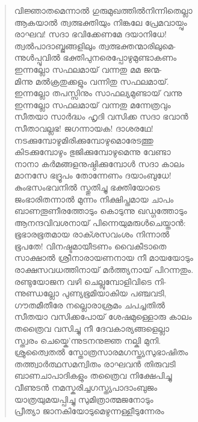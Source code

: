\begin{verse}
വിജ്ഞാതമെന്നാല്‍ ഗുരുമുഖത്തില്‍നിന്നിതെല്ലാ\\
ആകയാല്‍ ത്വത്ഭക്തിയും നിങ്കലേ പ്രേമവായ്പും\\
രാഘവ! സദാ ഭവിക്കേണമേ ദയാനിധേ!\\
ത്വല്‍പാദാബ്ജങ്ങളിലും ത്വത്ഭക്തന്മാരിലുമെ-\\
ന്നുള്‍പ്പൂവില്‍ ഭക്തിപുനരെപ്പോഴുമുണ്ടാകണം\\
ഇന്നല്ലോ സഫലമായ് വന്നതു മമ ജന്മ-\\
മിന്നു മല്‍ക്രതുക്കളും വന്നിതു സഫലമായ്.\\
ഇന്നല്ലോ തപസ്സിനും സാഫല്യമുണ്ടായ് വന്നു\\
ഇന്നല്ലോ സഫലമായ് വന്നതു മന്നേത്രവും\\
സീതയാ സാര്‍ദ്ധം ഹൃദി വസിക്ക സദാ ഭവാന്‍\\
സീതാവല്ലഭ! ജഗന്നായക! ദാശരഥേ!\\
നടക്കുമ്പോഴുമിരിക്കുമ്പോഴുമൊരേടത്തു\\
കിടക്കുമ്പോഴും ഭുജിക്കുമ്പോഴുമെന്നു വേണ്ടാ\\
നാനാ കര്‍മങ്ങളനുഷ്ഠിക്കുമ്പോള്‍ സദാ കാലം\\
മാനസേ ഭദ്രൂപം തോന്നേണം ദയാംബുധേ!\\
കുംഭസംഭവനില്‍ സ്തുതിച്ചു ഭക്തിയോടെ\\
ജംഭാരിതന്നാല്‍ മുന്നം നിക്ഷിപ്തമായ ചാപം\\
ബാണതൂണീരത്തോടും കൊടുന്നു ഖഡ്ഗത്തോടും\\
ആനന്ദവിവശനായ് പിന്നെയുമരുള്‍ചെയ്താന്‍:\\
ഭൂഭാരഭൂതമായ രാക്ശസവംശം നിന്നാല്‍\\
ഭൂപതേ! വിനഷ്ടമായീടണം വൈകീടാതെ\\
സാക്ഷാല്‍ ശ്രീനാരായണനായ നീ മായയോടും\\
രാക്ഷസവധത്തിനായ് മര്‍ത്ത്യനായ് പിറന്നതും.\\
രണ്ടുയോജന വഴി ചെല്ലുമ്പോളിവിടെ നി-\\
ന്നുണ്ഡല്ലോ പുണ്യഭൂമിയാകിയ പഞ്ചവടി,\\
ഗൗതമീതീരേ നല്ലൊരാശ്രമം ചപച്ചതില്‍\\
സീതയാ വസിക്കപോയ് ശേഷമുള്ളൊരു കാലം\\
തത്രൈവ വസിച്ചു നീ ദേവകാര്യങ്ങളെല്ലാ\\
സ്ത്വരം ചെയ്കെ’ന്നുടനനുജ്ഞ നല്കി മുനി.\\
ശ്രുത്വൈതല്‍ സ്തോത്രസാരമഗസ്ത്യസുഭാഷിതം\\
തത്ത്വാര്‍ത്ഥസമന്വിതം രാഘവന്‍ തിരുവടി\\
ബാണചാപാദികളും തത്രൈവ നിക്ഷേപിച്ചു\\
വീണുടന്‍ നമസ്കരിച്ചഗസ്ത്യപാദാംബുജം\\
യാത്രയുമയപ്പിച്ചു സുമിത്രാത്മജനോടും\\
പ്രീത്യാ ജാനകിയോടുമെഴുന്നള്ളീടുന്നേരം
\end{verse}

